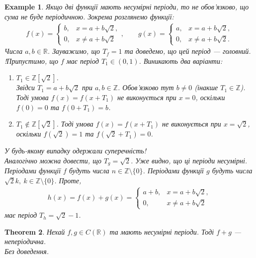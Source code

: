 \documentclass[a4paper, 10pt]{article}
\theoremstyle{theoremdd}
\newtheorem{theorem}{Theorem}[subsection]
\theoremstyle{theoremdd}
\theoremstyle{theoremdd}
\theoremstyle{theoremdd}
\newtheorem{example}[theorem]{Example}
\theoremstyle{theoremdd}
\theoremstyle{theoremdd}
\theoremstyle{theoremdd}
\theoremstyle{theoremdd}
\begin{document}
\begin{example}
Якщо дві функції мають несумірні періоди, то не обов'язково, що сума не буде періодичною. Зокрема розглянемо функції:
\begin{align*}
f(x) = \begin{cases} b, & x = a+b\sqrt{2}, \\ 0, & x \neq a+b\sqrt{2} \end{cases}, \qquad g(x) = \begin{cases} a, & x = a+b\sqrt{2}, \\ 0, & x \neq a+b\sqrt{2}. \end{cases}
\end{align*}
Числа $a,b \in \mathbb{R}$. Зауважимо, що $T_f = 1$ та доведемо, що цей період --- головний.
!Припустимо, що $f$ має період $T_1 \in (0,1)$. Виникають два варіанти:
\begin{enumerate}[wide=0pt,label={\Roman*.}]
\item $T_1 \in \mathbb{Z}[\sqrt{2}]$.\\
Звідси $T_1 = a+b\sqrt{2}$ при $a,b \in \mathbb{Z}$. Обов'язково тут $b \neq 0$ (\textit{інакше $T_1 \in \mathbb{Z}$}). Тоді умова $f(x) = f(x+T_1)$ не виконується при $x = 0$, оскільки $f(0) = 0$ та $f(0+T_1) = b$.

\item $T_1 \notin \mathbb{Z}[\sqrt{2}]$. Тоді умова $f(x) = f(x+T_1)$ не виконується при $x = \sqrt{2}$, оскільки $f(\sqrt{2}) = 1$ та $f(\sqrt{2}+T_1) = 0$.
\end{enumerate}
У будь-якому випадку одержали суперечність!\\
Аналогічно можна довести, що $T_g = \sqrt{2}$. Уже видно, що ці періоди несумірні.\\
Періодами функції $f$ будуть числа $n \in \mathbb{Z} \setminus \{0\}$. Періодами функції $g$ будуть числа $\sqrt{2}k,\ k \in \mathbb{Z} \setminus \{0\}$. Проте,
\begin{align*}
h(x) = f(x) + g(x) = \begin{cases} a+b, & x = a+b\sqrt{2}, \\ 0, & x \neq a+b\sqrt{2}  \end{cases}
\end{align*}
має період $T_h = \sqrt{2}-1$.
\end{example}

\begin{theorem}
Нехай $f,g \in C(\mathbb{R})$ та мають несумірні періоди. Тоді $f+g$ --- неперіодична.\\
\textit{Без доведення}.
\end{theorem}
\end{document}

